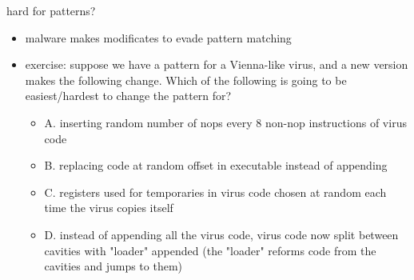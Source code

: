 

\begin{frame}{hard for patterns?}
    \begin{itemize}
    \item malware makes modificates to evade pattern matching
    \item exercise: suppose we have a pattern for a Vienna-like virus, and a new version makes the following
        change. Which of the following is going to be easiest/hardest to change the pattern for?
        \begin{itemize}
        \item A. inserting random number of nops every 8 non-nop instructions of virus code
        \item B. replacing code at random offset in executable instead of appending
        \item C. registers used for temporaries in virus code chosen at random each time the virus copies itself
        \item D. instead of appending all the virus code, virus code now split between cavities with "loader" appended (the "loader" reforms code from the cavities and jumps to them)
        \end{itemize}
    \end{itemize}
\end{frame}
